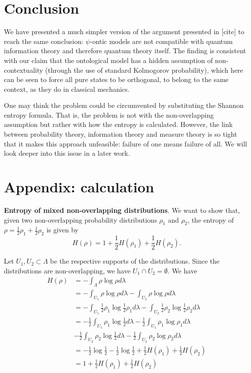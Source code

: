 \documentclass[10pt,twocolumn, nofootinbib]{revtex4-2}
\begin{document}
\section{Conclusion}

We have presented a much simpler version of the argument presented in [cite] to reach the same conclusion: $\psi$-ontic models are not compatible with quantum information theory and therefore quantum theory itself. The finding is consistent with our claim that the ontological model has a hidden assumption of non-contextuality (through the use of standard Kolmogorov probability), which here can be seen to force all pure states to be orthogonal, to belong to the same context, as they do in classical mechanics.

One may think the problem could be circumvented by substituting the Shannon entropy formula. That is, the problem is not with the non-overlapping assumption but rather with how the entropy is calculated. However, the link between probability theory, information theory and measure theory is so tight that it makes this approach unfeasible: failure of one means failure of all. We will look deeper into this issue in a later work.

\section*{Appendix: calculation}

\textbf{Entropy of mixed non-overlapping distributions}. We want to show that, given two non-overlapping probability distributions $\rho_1$ and $\rho_2$, the entropy of $\rho = \frac{1}{2} \rho_1 + \frac{1}{2} \rho_2$ is given by
\begin{equation}\label{entropy_nonoverlap_appendix}
	H(\rho) = 1 + \frac{1}{2} H(\rho_1) + \frac{1}{2} H(\rho_2).
\end{equation}

Let $U_1, U_2 \subset \Lambda$ be the respective supports of the distributions. Since the distributions are non-overlapping, we have $U_1 \cap U_2 = \emptyset$. We have
\begin{align*}
	H(\rho) &= - \int_\Lambda \rho \log \rho d\lambda \\
	&= -\int_{U_1} \rho \log \rho d\lambda -\int_{U_2} \rho \log \rho d\lambda \\
	&= -\int_{U_1} \frac{1}{2} \rho_1 \log \frac{1}{2} \rho_1 d\lambda -\int_{U_2} \frac{1}{2} \rho_2 \log \frac{1}{2} \rho_2 d\lambda \\
	&= - \frac{1}{2} \int_{U_1} \rho_1 \log \frac{1}{2} d\lambda - \frac{1}{2} \int_{U_1} \rho_1 \log \rho_1 d\lambda \\
	&- \frac{1}{2} \int_{U_2} \rho_2 \log \frac{1}{2} d\lambda - \frac{1}{2} \int_{U_2} \rho_2 \log \rho_2 d\lambda \\
	&= - \frac{1}{2} \log \frac{1}{2} - \frac{1}{2} \log \frac{1}{2} + \frac{1}{2} H(\rho_1) + \frac{1}{2} H(\rho_2) \\
	&= 1 + \frac{1}{2} H(\rho_1) + \frac{1}{2} H(\rho_2) \\
\end{align*}
\end{document}
